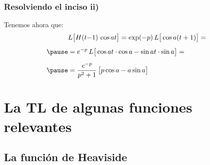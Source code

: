 \documentclass[12pt]{beamer}
\begin{document}
\begin{frame}
\frametitle{Resolviendo el inciso ii)}
Tenemos ahora que:
\pause
\begin{eqnarray*}
\begin{aligned}
&L \big[ H(t {-} 1) \, \cos a t \big] = \exp(- p) \, L \big[ \cos a (t + 1) \big] = \\[0.5em] \pause
&= e^{-p} \, L \big[ \cos a t \cdot \cos a - \sin a t \cdot \sin a \big] = \\[0.5em] \pause
&= \dfrac{e^{-p}}{p^{2} + 1} \, \big[ p \cos a - a \sin a \big]
\end{aligned}
\end{eqnarray*}
\end{frame}



\section{La TL de algunas funciones relevantes}
\subsection{La función de Heaviside}
\end{document}
